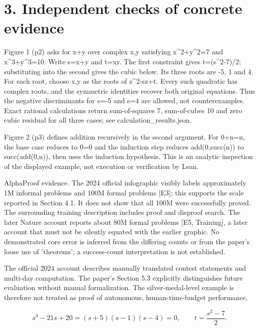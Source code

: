 \documentclass[10pt]{article}
\begin{document}
\section*{3. Independent checks of concrete evidence}
Figure 1 (p2) asks for x+y over complex x,y satisfying x\textasciicircum{}2+y\textasciicircum{}2=7 and x\textasciicircum{}3+y\textasciicircum{}3=10. Write s=x+y and t=xy. The first constraint gives t=(s\textasciicircum{}2-7)/2; substituting into the second gives the cubic below. Its three roots are -5, 1 and 4. For each root, choose x,y as the roots of z\textasciicircum{}2-sz+t. Every such quadratic has complex roots, and the symmetric identities recover both original equations. Thus the negative discriminants for s=-5 and s=4 are allowed, not counterexamples. Exact rational calculations return sum-of-squares 7, sum-of-cubes 10 and zero cubic residual for all three cases; see calculation\_results.json.\par
Figure 2 (p3) defines addition recursively in the second argument. For 0+n=n, the base case reduces to 0=0 and the induction step reduces add(0,succ(n)) to succ(add(0,n)), then uses the induction hypothesis. This is an analytic inspection of the displayed example, not execution or verification by Lean.\par
AlphaProof evidence. The 2024 official infographic visibly labels approximately 1M informal problems and 100M formal problems [E3]; this supports the scale reported in Section 4.1. It does not show that all 100M were successfully proved. The surrounding training description includes proof and disproof search. The later Nature account reports about 80M formal problems [E5, Training], a later account that must not be silently equated with the earlier graphic. No demonstrated core error is inferred from the differing counts or from the paper’s loose use of ’theorems’; a success-count interpretation is not established.\par
The official 2024 account describes manually translated contest statements and multi-day computation. The paper’s Section 5.3 explicitly distinguishes future evaluation without manual formalization. The silver-medal-level example is therefore not treated as proof of autonomous, human-time-budget performance.\par
\[s^3-21s+20=(s+5)(s-1)(s-4)=0,\qquad t=\frac{s^2-7}{2}.\]\par
\end{document}
